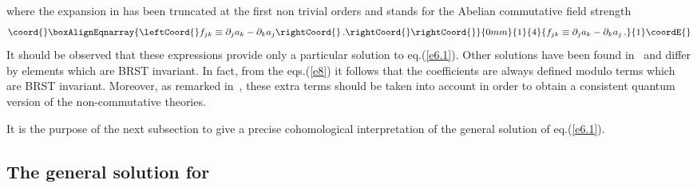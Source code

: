 \documentclass[a4paper,12pt]{article}
\begin{document}
where the expansion in \myHighlight{$\theta$}\coordHE{} has been truncated at the first non trivial
 orders and  \coordHE{} stands for the Abelian commutative field  strength 
%
\begin{eqnarray}\coord{}\boxAlignEqnarray{\leftCoord{}
f_{jk} \equiv \partial_j a_k - \partial_k a_j \rightCoord{}\, .\rightCoord{}
\label{e10}
\rightCoord{}}{0mm}{1}{4}{
f_{jk} \equiv \partial_j a_k - \partial_k a_j \, .
}{1}\coordE{}\end{eqnarray}
%
It should be observed that these expressions  provide only a particular
 solution  to eq.(\ref{e6.1}).
Other solutions have been found in~\cite{Okuyama:2001sw,Jurco:2001rq} and
 differ by elements which are BRST invariant. In fact, from the eqs.(\ref{e8}) 
 it follows that the coefficients \coordHE{} are always defined modulo terms
 which are BRST invariant.
Moreover, as remarked in~\cite{Jurco:2001rq,Bichl:2001cq}, these
 extra terms should be taken into account in order to obtain a consistent
 quantum version of the non-commutative theories.

It is the purpose of the next subsection to give a precise
 cohomological interpretation of the general solution of eq.(\ref{e6.1}).

\subsection{The general solution for \coordHE{}}
\end{document}
